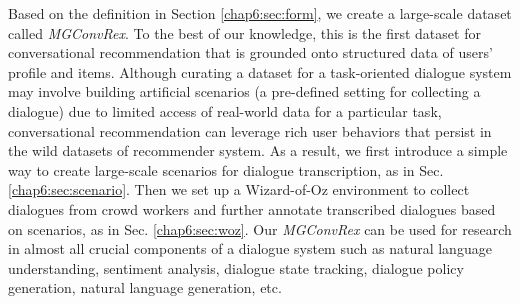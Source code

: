 Based on the definition in Section \ref{chap6:sec:form}, we create a large-scale dataset called \textit{MGConvRex}.
To the best of our knowledge, this is the first dataset for conversational recommendation that is grounded onto structured data of users' profile and items.
Although curating a dataset for a task-oriented dialogue system may involve building artificial scenarios (a pre-defined setting for collecting a dialogue) \cite{li2016user,li2018microsoft} due to limited access of real-world data for a particular task, conversational recommendation can leverage rich user behaviors that persist in the wild datasets of recommender system.  
As a result, we first introduce a simple way to create large-scale scenarios for dialogue transcription, as in Sec. \ref{chap6:sec:scenario}.
Then we set up a Wizard-of-Oz environment \cite{dstc2,woz,multiwoz,multiwoz2.1} to collect dialogues from crowd workers and further annotate transcribed dialogues based on scenarios, as in Sec. \ref{chap6:sec:woz}.
Our \textit{MGConvRex} can be used for research in almost all crucial components of a dialogue system such as natural language understanding, sentiment analysis, dialogue state tracking, dialogue policy generation, natural language generation, etc.

